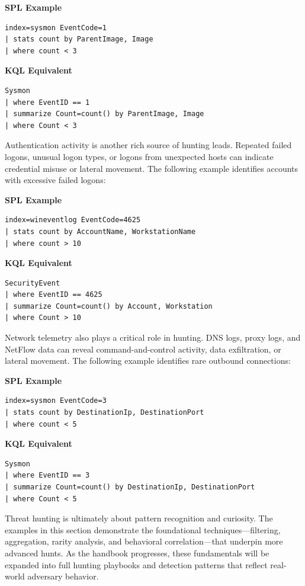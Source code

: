 \textbf{SPL Example}
\begin{lstlisting}
index=sysmon EventCode=1
| stats count by ParentImage, Image
| where count < 3
\end{lstlisting}

\textbf{KQL Equivalent}
\begin{lstlisting}
Sysmon
| where EventID == 1
| summarize Count=count() by ParentImage, Image
| where Count < 3
\end{lstlisting}

Authentication activity is another rich source of hunting leads. Repeated failed logons, unusual logon types, or logons from unexpected hosts can indicate credential misuse or lateral movement. The following example identifies accounts with excessive failed logons:

\textbf{SPL Example}
\begin{lstlisting}
index=wineventlog EventCode=4625
| stats count by AccountName, WorkstationName
| where count > 10
\end{lstlisting}

\textbf{KQL Equivalent}
\begin{lstlisting}
SecurityEvent
| where EventID == 4625
| summarize Count=count() by Account, Workstation
| where Count > 10
\end{lstlisting}

Network telemetry also plays a critical role in hunting. DNS logs, proxy logs, and NetFlow data can reveal command-and-control activity, data exfiltration, or lateral movement. The following example identifies rare outbound connections:

\textbf{SPL Example}
\begin{lstlisting}
index=sysmon EventCode=3
| stats count by DestinationIp, DestinationPort
| where count < 5
\end{lstlisting}

\textbf{KQL Equivalent}
\begin{lstlisting}
Sysmon
| where EventID == 3
| summarize Count=count() by DestinationIp, DestinationPort
| where Count < 5
\end{lstlisting}

Threat hunting is ultimately about pattern recognition and curiosity. The examples in this section demonstrate the foundational techniques—filtering, aggregation, rarity analysis, and behavioral correlation—that underpin more advanced hunts. As the handbook progresses, these fundamentals will be expanded into full hunting playbooks and detection patterns that reflect real-world adversary behavior.
